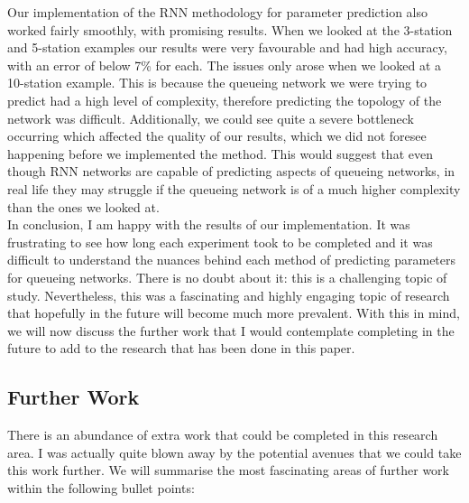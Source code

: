 \documentclass[a4paper,11pt,titlepage]{article}
\begin{document}
Our implementation of the RNN methodology for parameter prediction also worked fairly smoothly, with promising results. When we looked at the 3-station and 5-station examples our results were very favourable and had high accuracy, with an error of below 7\% for each. The issues only arose when we looked at a 10-station example. This is because the queueing network we were trying to predict had a high level of complexity, therefore predicting the topology of the network was difficult. Additionally, we could see quite a severe bottleneck occurring which affected the quality of our results, which we did not foresee happening before we implemented the method. This would suggest that even though RNN networks are capable of predicting aspects of queueing networks, in real life they may struggle if the queueing network is of a much higher complexity than the ones we looked at. \\

In conclusion, I am happy with the results of our implementation. It was frustrating to see how long each experiment took to be completed and it was difficult to understand the nuances behind each method of predicting parameters for queueing networks. There is no doubt about it: this is a challenging topic of study. Nevertheless, this was a fascinating and highly engaging topic of research that hopefully in the future will become much more prevalent. With this in mind, we will now discuss the further work that I would contemplate completing in the future to add to the research that has been done in this paper.

\subsection{Further Work}

There is an abundance of extra work that could be completed in this research area. I was actually quite blown away by the potential avenues that we could take this work further. We will summarise the most fascinating areas of further work within the following bullet points: 
\end{document}
